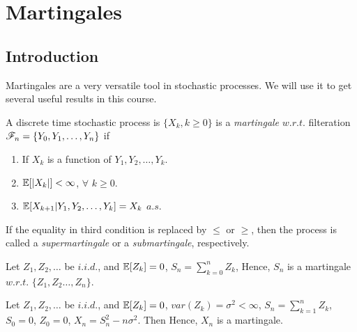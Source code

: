 \documentclass[all-lectures.tex]{subfiles}
\begin{document}

\chapter{Martingales}
\setcounter{section}{0}
\setcounter{subsection}{0}

\section*{}

\section{Introduction}
Martingales are a very versatile tool in stochastic processes. 
We will use it to get several useful results in this course.

A discrete time stochastic process is $\{X_k, k\ge 0\}$ is a \textit{martingale} $w.r.t.$ filteration $\mathscr{F}_n=\{Y_0, Y_1, \dots, Y_ n\}$ if 
\begin{enumerate}
\item If $X_k$ is a function of $Y_1, Y_2, \dots, Y_k$.
\item $\mathbb{E}[|X_k|] < \infty$, \quad $\forall$ $k \ge 0$.
\item $\mathbb{E}[X_{k+1}|Y_1, Y_2, \dots, Y_k] = X_k$ \quad $a.s.$
\end{enumerate}
 If the equality in third condition is replaced by $\le$ or $\ge$, then the process is called a \textit{supermartingale} or a \textit{submartingale}, respectively.
\begin{exmp}
Let $Z_1, Z_2, \dots $ be $i.i.d.$, and $\mathbb{E}[Z_k]=0$, $S_n = \sum_{k=0}^{n} Z_k$,
Hence, $S_n$ is a martingale $w.r.t.$ $\{Z_1,Z_2 \dots, Z_n\}$.
\end{exmp}

\begin{exmp}
Let $Z_1, Z_2, \dots $ be $i.i.d.$, and $\mathbb{E}[Z_k]=0$,  $var(Z_k)= \sigma^2 < \infty$,  $S_n = \sum_{k=1}^{n} Z_k$, $S_0 =0$, $Z_0=0$, $X_n = S^2_n - n \sigma^2$.
Then
Hence, $X_n$ is a martingale.
\end{exmp}
\end{document}
